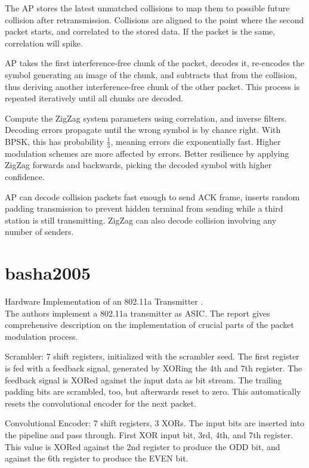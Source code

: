 The AP stores the latest unmatched collisions to map them to possible future collision after retransmission. Collisions are aligned to the point where the second packet starts, and correlated to the stored data. If the packet is the same, correlation will spike.

AP takes the first interference-free chunk of the packet, decodes it, re-encodes the symbol generating an image of the chunk, and subtracts that from the collision, thus deriving another interference-free chunk of the other packet. This process is repeated iteratively until all chunks are decoded.

Compute the ZigZag system parameters using correlation, and inverse filters. Decoding errors propagate until the wrong symbol is by chance right. With BPSK, this has probability $\frac{1}{3}$, meaning errors die exponentially fast. Higher modulation schemes are more affected by errors. Better resilience by applying ZigZag forwards and backwards, picking the decoded symbol with higher confidence.

AP can decode collision packets fast enough to send ACK frame, inserts random padding transmission to prevent hidden terminal from sending while a third station is still transmitting. ZigZag can also decode collision involving any number of senders.



\section{basha2005}

Hardware Implementation of an 802.11a Transmitter \cite{basha2005}.\\

The authors implement a 802.11a transmitter as ASIC. The report gives comprehensive description on the implementation of crucial parts of the packet modulation process.

Scrambler: 7 shift registers, initialized with the scrambler seed. The first register is fed with a feedback signal, generated by XORing the 4th and 7th register. The feedback signal is XORed against the input data as bit stream. The trailing padding bits are scrambled, too, but afterwards reset to zero. This automatically resets the convolutional encoder for the next packet.

Convolutional Encoder: 7 shift registers, 3 XORs. The input bits are inserted into the pipeline and pass through. First XOR input bit, 3rd, 4th, and 7th register. This value is XORed against the 2nd register to produce the ODD bit, and against the 6th register to produce the EVEN bit.

